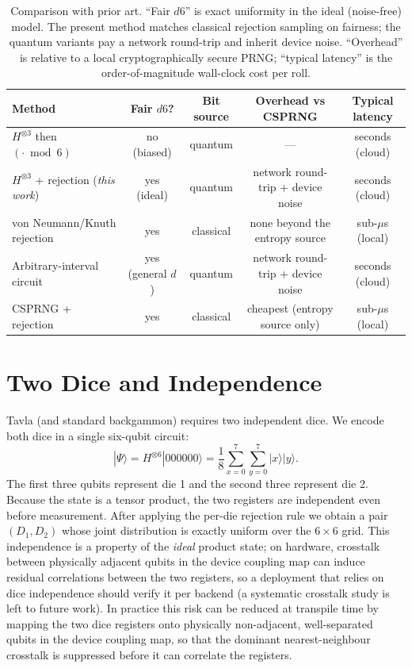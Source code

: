 \documentclass{ieeeaccess}
\begin{document}
\begin{table}[t]
\centering
\caption{Comparison with prior art. ``Fair $d6$'' is exact uniformity in the ideal (noise-free) model. The present method matches classical rejection sampling on fairness; the quantum variants pay a network round-trip and inherit device noise. ``Overhead'' is relative to a local cryptographically secure PRNG; ``typical latency'' is the order-of-magnitude wall-clock cost per roll.}
\label{tab:compare}
\begin{tabular}{lcccc}
\toprule
Method & Fair $d6$? & Bit source & Overhead vs CSPRNG & Typical latency \\
\midrule
$H^{\otimes 3}$ then $(\cdot \bmod 6)$ & no (biased) & quantum & --- & seconds (cloud) \\
$H^{\otimes 3}$ + rejection (\emph{this work}) & yes (ideal) & quantum & network round-trip + device noise & seconds (cloud) \\
von Neumann/Knuth rejection~\cite{vonneumann1951various,knuth1997seminumerical} & yes & classical & none beyond the entropy source & sub-$\mu$s (local) \\
Arbitrary-interval circuit~\cite{orts2023quantum} & yes (general $d$) & quantum & network round-trip + device noise & seconds (cloud) \\
CSPRNG + rejection~\cite{nist80090c} & yes & classical & cheapest (entropy source only) & sub-$\mu$s (local) \\
\bottomrule
\end{tabular}
\end{table}

\section{Two Dice and Independence}
\label{sec:two}

Tavla (and standard backgammon) requires two independent dice. We encode both dice in a single six-qubit circuit:
\begin{equation}
|\Psi\rangle = H^{\otimes 6}|000000\rangle = \frac{1}{8}\sum_{x=0}^{7}\sum_{y=0}^{7}|x\rangle|y\rangle.
\end{equation}
The first three qubits represent die 1 and the second three represent die 2. Because the state is a tensor product, the two registers are independent even before measurement. After applying the per-die rejection rule we obtain a pair $(D_1,D_2)$ whose joint distribution is exactly uniform over the $6\times 6$ grid. This independence is a property of the \emph{ideal} product state; on hardware, crosstalk between physically adjacent qubits in the device coupling map can induce residual correlations between the two registers, so a deployment that relies on dice independence should verify it per backend (a systematic crosstalk study is left to future work). In practice this risk can be reduced at transpile time by mapping the two dice registers onto physically non-adjacent, well-separated qubits in the device coupling map, so that the dominant nearest-neighbour crosstalk is suppressed before it can correlate the registers.
\end{document}
